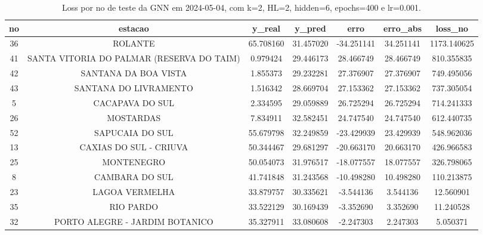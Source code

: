 \begin{table}[h]
\centering
\caption{Loss por no de teste da GNN em 2024-05-04, com k=2, HL=2, hidden=6, epochs=400 e lr=0.001.}
\label{tab:gnn_loss_k2_hl2_h6_e400_d20240504}
\begin{tabular}{ccccccc}
\toprule
no & estacao & y\_real & y\_pred & erro & erro\_abs & loss\_no \\
\midrule
36 & ROLANTE & 65.708160 & 31.457020 & -34.251141 & 34.251141 & 1173.140625 \\
41 & SANTA VITORIA DO PALMAR (RESERVA DO TAIM) & 0.979424 & 29.446173 & 28.466749 & 28.466749 & 810.355835 \\
42 & SANTANA DA BOA VISTA & 1.855373 & 29.232281 & 27.376907 & 27.376907 & 749.495056 \\
43 & SANTANA DO LIVRAMENTO & 1.516342 & 28.669704 & 27.153362 & 27.153362 & 737.305054 \\
5 & CACAPAVA DO SUL & 2.334595 & 29.059889 & 26.725294 & 26.725294 & 714.241333 \\
26 & MOSTARDAS & 7.834911 & 32.582451 & 24.747540 & 24.747540 & 612.440735 \\
52 & SAPUCAIA DO SUL & 55.679798 & 32.249859 & -23.429939 & 23.429939 & 548.962036 \\
13 & CAXIAS DO SUL - CRIUVA & 50.344467 & 29.681297 & -20.663170 & 20.663170 & 426.966583 \\
25 & MONTENEGRO & 50.054073 & 31.976517 & -18.077557 & 18.077557 & 326.798065 \\
8 & CAMBARA DO SUL & 41.741848 & 31.243568 & -10.498280 & 10.498280 & 110.213875 \\
23 & LAGOA VERMELHA & 33.879757 & 30.335621 & -3.544136 & 3.544136 & 12.560901 \\
35 & RIO PARDO & 33.522129 & 30.169439 & -3.352690 & 3.352690 & 11.240528 \\
32 & PORTO ALEGRE - JARDIM BOTANICO & 35.327911 & 33.080608 & -2.247303 & 2.247303 & 5.050371 \\
\bottomrule
\end{tabular}
\end{table}
